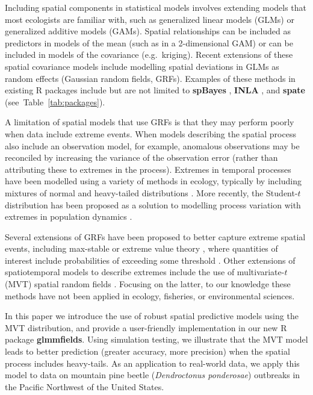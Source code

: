 \documentclass[12pt,english]{article}
\begin{document}
\begin{spacing}{1.9}
Including spatial components in statistical models involves extending models
that most ecologists are familiar with, such as generalized linear
models (GLMs) or generalized additive models (GAMs). Spatial relationships can
be included as predictors in models of the mean (such as in a 2-dimensional GAM)
or can be included in models of the covariance (e.g.\ kriging). Recent
extensions of these spatial covariance models include modelling spatial
deviations in GLMs as random effects (Gaussian random fields, GRFs).
Examples of these methods in existing R packages include but are not limited to
\textbf{spBayes} \citep{finley2007}, \textbf{INLA} \citep{rue2009}, and
\textbf{spate} \citep{sigrist2015} (see~Table~\ref{tab:packages}).

A limitation of spatial models that use GRFs is that they may perform poorly
when data include extreme events. When models describing the spatial process
also include an observation model, for example, anomalous observations may be
reconciled by increasing the variance of the observation error (rather than
attributing these to extremes in the process). Extremes in temporal processes
have been modelled using a variety of methods in ecology, typically by including
mixtures of normal and heavy-tailed distributions \citep[e.g.][]{everitt1996,
  ward2007, thorson2011}. More recently, the Student-$t$ distribution has been
proposed as a solution to modelling process variation with extremes in
population dynamics \citep{anderson2017}.

Several extensions of GRFs have been proposed to better capture extreme spatial
events, including max-stable or extreme value theory \citep{davison2012,
  davison2012a}, where quantities of interest include probabilities of exceeding
some threshold \citep{davis2008}. Other extensions of spatiotemporal models to
describe extremes include the use of multivariate-$t$ (MVT) spatial random
fields \citep{roislien2007}. Focusing on the latter, to our knowledge these
methods have not been applied in ecology, fisheries, or environmental sciences.

In this paper we introduce the use of robust spatial predictive models using the
MVT distribution, and provide a user-friendly implementation in our new R
package \textbf{glmmfields}. Using simulation testing, we illustrate that the
MVT model leads to better prediction (greater accuracy, more precision) when the
spatial process includes heavy-tails. As an application to real-world data, we
apply this model to data on mountain pine beetle (\textit{Dendroctonus
  ponderosae}) outbreaks in the Pacific Northwest of the United States.


\end{spacing}
\end{document}
